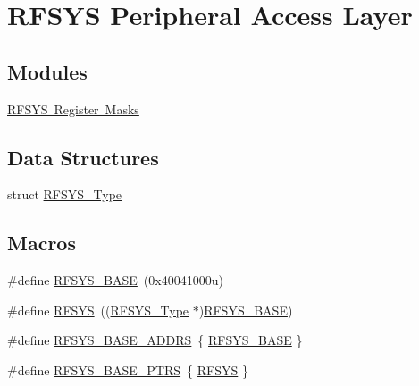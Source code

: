 \hypertarget{group___r_f_s_y_s___peripheral___access___layer}{}\section{R\+F\+S\+YS Peripheral Access Layer}
\label{group___r_f_s_y_s___peripheral___access___layer}
\subsection*{Modules}
\begin{DoxyCompactItemize}
\item 
\mbox{\hyperlink{group___r_f_s_y_s___register___masks}{R\+F\+S\+Y\+S Register Masks}}
\end{DoxyCompactItemize}
\subsection*{Data Structures}
\begin{DoxyCompactItemize}
\item 
struct \mbox{\hyperlink{struct_r_f_s_y_s___type}{R\+F\+S\+Y\+S\+\_\+\+Type}}
\end{DoxyCompactItemize}
\subsection*{Macros}
\begin{DoxyCompactItemize}
\item 
\#define \mbox{\hyperlink{group___r_f_s_y_s___peripheral___access___layer_ga742dcff49e1d900ccc5fb6d716dac969}{R\+F\+S\+Y\+S\+\_\+\+B\+A\+SE}}~(0x40041000u)
\item 
\#define \mbox{\hyperlink{group___r_f_s_y_s___peripheral___access___layer_ga83a5a75f5421c69ce93437b8be3c1144}{R\+F\+S\+YS}}~((\mbox{\hyperlink{struct_r_f_s_y_s___type}{R\+F\+S\+Y\+S\+\_\+\+Type}} $\ast$)\mbox{\hyperlink{group___r_f_s_y_s___peripheral___access___layer_ga742dcff49e1d900ccc5fb6d716dac969}{R\+F\+S\+Y\+S\+\_\+\+B\+A\+SE}})
\item 
\#define \mbox{\hyperlink{group___r_f_s_y_s___peripheral___access___layer_ga65742e072e59ddefb5bc976bbd6f517b}{R\+F\+S\+Y\+S\+\_\+\+B\+A\+S\+E\+\_\+\+A\+D\+D\+RS}}~\{ \mbox{\hyperlink{group___r_f_s_y_s___peripheral___access___layer_ga742dcff49e1d900ccc5fb6d716dac969}{R\+F\+S\+Y\+S\+\_\+\+B\+A\+SE}} \}
\item 
\#define \mbox{\hyperlink{group___r_f_s_y_s___peripheral___access___layer_ga59f6caa8732744ac3a9f91828ec2daa1}{R\+F\+S\+Y\+S\+\_\+\+B\+A\+S\+E\+\_\+\+P\+T\+RS}}~\{ \mbox{\hyperlink{group___r_f_s_y_s___peripheral___access___layer_ga83a5a75f5421c69ce93437b8be3c1144}{R\+F\+S\+YS}} \}
\end{DoxyCompactItemize}


